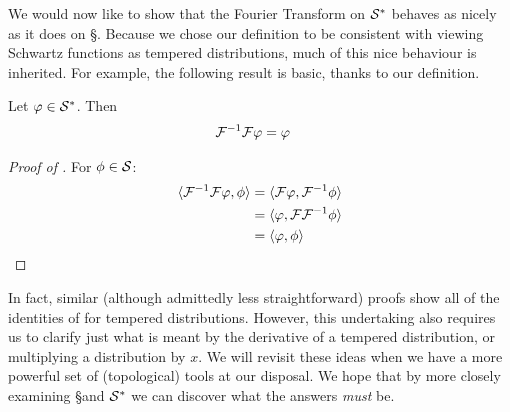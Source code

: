       We would now like to show that the Fourier Transform on $\S^*$ behaves as nicely as it does on \S.
      Because we chose our definition to be consistent with viewing Schwartz functions as tempered distributions, much of this nice behaviour is inherited.
      For example, the following result is basic, thanks to our definition.
      \begin{thm}
        \label{thm:fourinv_td}
        Let $\varphi\in\S^*$.
        Then
        \begin{align*}
          \F^{-1}\F\varphi &= \varphi
        \end{align*}
      \end{thm}
      \begin{proof}[Proof of ]
        For $\phi\in\S$:
        \begin{align*}
          \langle\F^{-1}\F\varphi, \phi\rangle &= \langle \F\varphi, \F^{-1}\phi\rangle\\
          &= \langle\varphi, \F\F^{-1}\phi\rangle\\
          &= \langle\varphi, \phi\rangle
        \end{align*}
      \end{proof}

      In fact, similar (although admittedly less straightforward) proofs show all of the identities of  for tempered distributions.
      However, this undertaking also requires us to clarify just what is meant by the derivative of a tempered distribution, or multiplying a distribution by $x$.
      We will revisit these ideas when we have a more powerful set of (topological) tools at our disposal.
      We hope that by more closely examining \S and $\S^*$ we can discover what the answers \emph{must} be.


